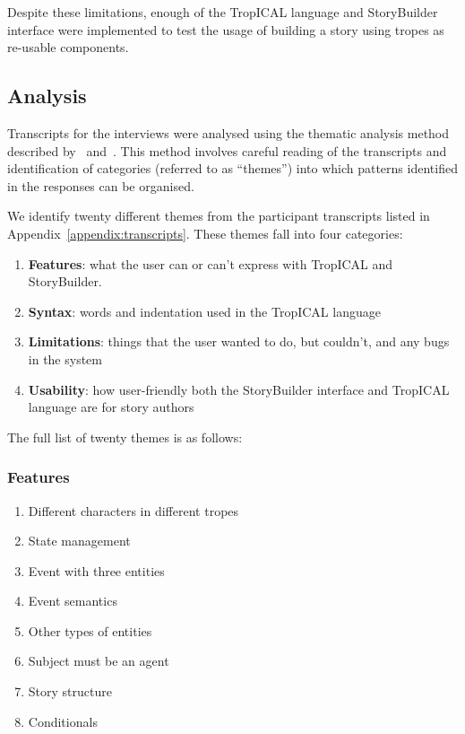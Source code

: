\documentclass[11pt]{report}
\begin{document}
Despite these limitations, enough of the TropICAL language and StoryBuilder
interface were implemented to test the usage of building a story using tropes as
re-usable components.

\subsection{Analysis}
\label{sec:sb-analysis}

Transcripts for the interviews were analysed using the thematic analysis method
described by~\citet{hayes2000doing} and~\citet{clarke2014thematic}. 
This method involves careful reading of the transcripts and identification of
categories (referred to as ``themes'') into which patterns identified in the
responses can be organised.

We identify twenty different themes from the participant transcripts listed in
Appendix~\ref{appendix:transcripts}. These themes fall into four categories:

\begin{enumerate}
\item \textbf{Features}: what the user can or can't express with
  TropICAL and StoryBuilder.
\item \textbf{Syntax}: words and indentation used in the TropICAL language
\item \textbf{Limitations}: things that the user wanted to do, but
  couldn't, and any bugs in the system
\item \textbf{Usability}: how user-friendly both the StoryBuilder
  interface and TropICAL language are for story authors
\end{enumerate}

The full list of twenty themes is as follows:

\subsubsection{Features}
\begin{enumerate}
\item {Different characters in different tropes}
\item {State management}
\item {Event with three entities}
\item {Event semantics}
\item {Other types of entities}
\item {Subject must be an agent}
\item {Story structure}
\item {Conditionals}
\end{enumerate}
\end{document}
